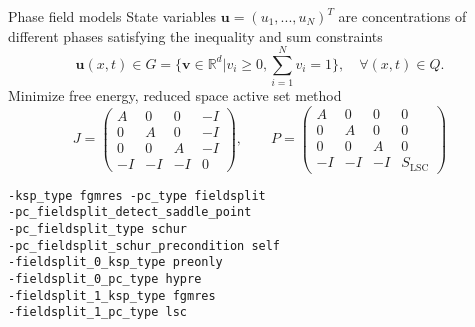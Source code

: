 \begin{frame}[fragile]{Phase field models}
  State variables $\bm{u} = (u_1,...,u_N)^{T}$ are concentrations of different phases satisfying the inequality and sum constraints
\[ \bm{u}(x,t) \in G = \{\bm{v}\in \mathbb{R}^{d}| v_i \geq 0, \sum_{i = 1}^{N} v_i = 1\},\quad \forall (x,t) \in Q. \]
Minimize free energy, reduced space active set method
\begin{equation*}
J =
\begin{pmatrix}
A  & 0  & 0  & -I \\
0  & A  & 0  & -I \\
0  & 0  & A  & -I \\
-I & -I & -I & 0 
\end{pmatrix}, \qquad
P = 
\begin{pmatrix}
A  & 0  & 0  & 0 \\
0  & A  & 0  & 0 \\
0  & 0  & A  & 0 \\
-I & -I & -I & S_{\text{LSC}}
\end{pmatrix}
\end{equation*}
\begin{Verbatim}[formatcom=\footnotesize]
-ksp_type fgmres -pc_type fieldsplit 
-pc_fieldsplit_detect_saddle_point 
-pc_fieldsplit_type schur
-pc_fieldsplit_schur_precondition self 
-fieldsplit_0_ksp_type preonly
-fieldsplit_0_pc_type hypre
-fieldsplit_1_ksp_type fgmres 
-fieldsplit_1_pc_type lsc
\end{Verbatim}
\end{frame}
